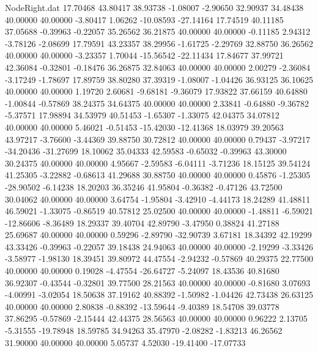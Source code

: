 \begin{filecontents}{NodeRight.dat}
  17.70468   43.80417   38.93738    -1.08007   -2.90650   32.90937   34.48438   40.00000   40.00000   -3.80417    1.06262  -10.08593  -27.14164
  17.74519   40.11185   37.05688    -0.39963   -0.22057   35.26562   36.21875   40.00000   40.00000   -0.11185    2.94312   -3.78126   -2.08699
  17.79591   43.23357   38.29956    -1.61725   -2.29769   32.88750   36.26562   40.00000   40.00000   -3.23357    1.70044  -15.56542  -22.11434
  17.84677   37.99721   42.36084    -0.32801   -0.18476   36.26875   32.84063   40.00000   40.00000    2.00279   -2.36084   -3.17249   -1.78697
  17.89759   38.80280   37.39319    -1.08007   -1.04426   36.93125   36.10625   40.00000   40.00000    1.19720    2.60681   -9.68181   -9.36079
  17.93822   37.66159   40.64880    -1.00844   -0.57869   38.24375   34.64375   40.00000   40.00000    2.33841   -0.64880   -9.36782   -5.37571
  17.98894   34.53979   40.51453    -1.65307   -1.33075   42.04375   34.07812   40.00000   40.00000    5.46021   -0.51453  -15.42030  -12.41368
  18.03979   39.20563   43.97217    -3.76600   -3.44369   39.88750   30.72812   40.00000   40.00000    0.79437   -3.97217  -34.20436  -31.27699
  18.10062   35.04333   42.59583    -0.65032   -0.39963   43.30000   30.24375   40.00000   40.00000    4.95667   -2.59583   -6.04111   -3.71236
  18.15125   39.54124   41.25305    -3.22882   -0.68613   41.29688   30.88750   40.00000   40.00000    0.45876   -1.25305  -28.90502   -6.14238
  18.20203   36.35246   41.95804    -0.36382   -0.47126   43.72500   30.04062   40.00000   40.00000    3.64754   -1.95804   -3.42910   -4.44173
  18.24289   41.48811   46.59021    -1.33075   -0.86519   40.57812   25.02500   40.00000   40.00000   -1.48811   -6.59021  -12.86606   -8.36489
  18.29337   39.40704   42.89790    -3.47950    0.38824   41.27188   25.69687   40.00000   40.00000    0.59296   -2.89790  -32.90739    3.67181
  18.34392   42.19299   43.33426    -0.39963   -0.22057   39.18438   24.94063   40.00000   40.00000   -2.19299   -3.33426   -3.58977   -1.98130
  18.39451   39.80972   44.47554    -2.94232   -0.57869   40.29375   22.77500   40.00000   40.00000    0.19028   -4.47554  -26.64727   -5.24097
  18.43536   40.81680   36.92307    -0.43544   -0.32801   39.77500   28.21563   40.00000   40.00000   -0.81680    3.07693   -4.00991   -3.02054
  18.50638   37.19162   40.88392    -1.50982   -1.04426   42.73438   26.63125   40.00000   40.00000    2.80838   -0.88392  -13.59644   -9.40389
  18.54708   39.03778   37.86295    -0.57869   -2.15444   42.44375   28.56563   40.00000   40.00000    0.96222    2.13705   -5.31555  -19.78948
  18.59785   34.94263   35.47970    -2.08282   -1.83213   46.26562   31.90000   40.00000   40.00000    5.05737    4.52030  -19.41400  -17.07733

\end{filecontents}
